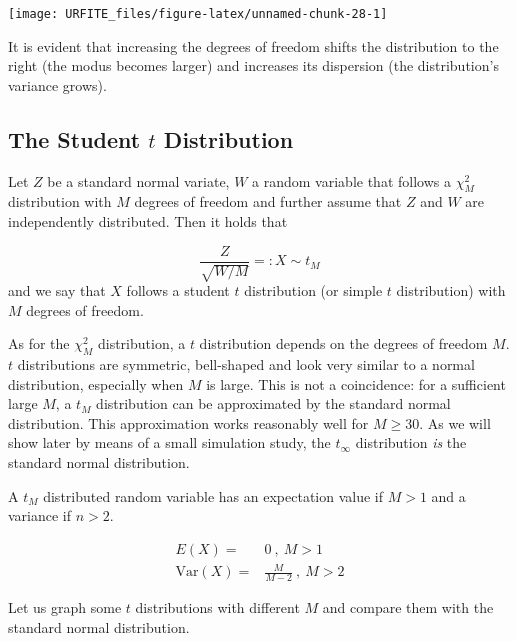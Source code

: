 \documentclass[]{book}
\theoremstyle{definition}
\theoremstyle{definition}
\theoremstyle{definition}
\theoremstyle{remark}
\begin{document}
\begin{center}\texttt{[image: URFITE\_files/figure-latex/unnamed-chunk-28-1]} \end{center}

It is evident that increasing the degrees of freedom shifts the
distribution to the right (the modus becomes larger) and increases its
dispersion (the distribution's variance grows).

\hypertarget{thetdist}{\subsection*{\texorpdfstring{The Student \(t\)
Distribution}{The Student t Distribution}}\label{thetdist}}

Let \(Z\) be a standard normal variate, \(W\) a random variable that
follows a \(\chi^2_M\) distribution with \(M\) degrees of freedom and
further assume that \(Z\) and \(W\) are independently distributed. Then
it holds that

\[ \frac{Z}{\sqrt{W/M}} =:X \sim t_M \] and we say that \(X\) follows a
student \(t\) distribution (or simple \(t\) distribution) with \(M\)
degrees of freedom.

As for the \(\chi^2_M\) distribution, a \(t\) distribution depends on
the degrees of freedom \(M\). \(t\) distributions are symmetric,
bell-shaped and look very similar to a normal distribution, especially
when \(M\) is large. This is not a coincidence: for a sufficient large
\(M\), a \(t_M\) distribution can be approximated by the standard normal
distribution. This approximation works reasonably well for \(M\geq 30\).
As we will show later by means of a small simulation study, the
\(t_{\infty}\) distribution \emph{is} the standard normal distribution.

A \(t_M\) distributed random variable has an expectation value if
\(M>1\) and a variance if \(n>2\).

\begin{align}
  E(X) =& 0 \ , \ M>1 \\
  \text{Var}(X) =& \frac{M}{M-2} \ , \ M>2
\end{align}

Let us graph some \(t\) distributions with different \(M\) and compare
them with the standard normal distribution.
\end{document}
